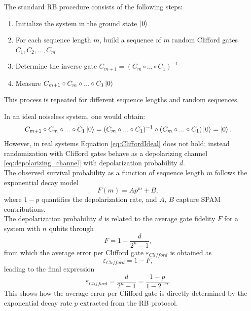 The standard RB procedure consists of the following steps:
\begin{enumerate}\label{routine:RB}
    \item Initialize the system in the ground state $\ket{0}$
    \item For each sequence length $m$, build a sequence of $m$ random Clifford gates $C_1, C_2, ..., C_m$
    \item Determine the inverse gate $C_{m+1}=(C_m\circ...\circ C_1)^{-1}$
    \item Measure $C_{m+1}\circ C_m \circ ...\circ C_1 \ket{0}$
\end{enumerate}
This process is repeated for different sequence lengths and random sequences.

In an ideal noiseless system, one would obtain:
\begin{equation}\label{eq:CliffordIdeal}
    C_{m+1}\circ C_m \circ ...\circ C_1 \ket{0} = (C_m\circ...\circ C_1)^{-1}\circ(C_m\circ...\circ C_1)\ket{0} = \ket{0}.
\end{equation}
However, in real systems Equation \ref{eq:CliffordIdeal} does not hold; instead randomization with Clifford gates behave as a depolarizing channel \ref{eq:depolarizing_channel} with depolarization probability $d$.\\
The observed survival probability as a function of sequence length $m$ follows the exponential decay model
\begin{equation}\label{eq:RB_decay}
    F(m) = Ap^m +B,
\end{equation}
where $1-p$ quantifies the depolarization rate, and $A$, $B$ capture SPAM contributions.\\
The depolarization probability $d$ is related to the average gate fidelity $F$ for a system with $n$ qubits through
\begin{equation}
    F = 1 - \frac{d}{2^n - 1}\label{eq:avarage_gate_fidelity},
\end{equation}
from which the average error per Clifford gate $\varepsilon_{Clifford}$ is obtained as
\begin{equation}
    \varepsilon_{Clifford} = 1 - F \label{eq:avg_error_Clifford_gate},
\end{equation}
leading to the final expression
\begin{equation}
    \varepsilon_{Clifford} = \frac{d}{2^n -1} = \frac{1-p}{1-2^{-n}}.
\end{equation}
This shows how the average error per Clifford gate is directly determined by the exponential decay rate $p$ extracted from the RB protocol.


